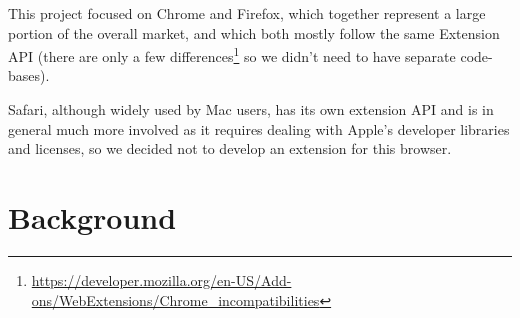\documentclass[bsc,frontabs,twoside,singlespacing,parskip,deptreport]{infthesis}
\begin{document}
This project focused on Chrome and Firefox, which together represent a large portion of the overall market, and which both mostly follow the same Extension API (there are only a few differences\footnote{\href{https://developer.mozilla.org/en-US/Add-ons/WebExtensions/Chrome\_incompatibilities}{https://developer.mozilla.org/en-US/Add-ons/WebExtensions/Chrome\_incompatibilities}} so we didn't need to have separate code-bases).

Safari, although widely used by Mac users, has its own extension API and is in general much more involved as it requires dealing with Apple's developer libraries and licenses, so we decided not to develop an extension for this browser.







\chapter{Background}
\end{document}
